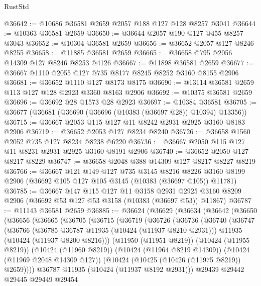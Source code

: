 \begin{lexlean}{RustStd}
\begin{coremodule}
@36642 := @10686 @36581 @2659 @2057 @188 @127 @128 @8257 @3041
@36644 := @10363 @36581 @2659
@36650 := @36644 @2057 @190 @127 @455 @8257 @3043
@36652 := @10304 @36581 @2659
@36656 := @36652 @2057 @127 @8246 @8255
@36658 := @11885 @36581 @2659
@36665 := @36658 @795 @2056 @14309 @127 @8246 @8253 @4126
@36667 := @11898 @36581 @2659
@36677 := @36667 @1110 @2055 @127 @735 @8177 @8245 @8252 @3160 @8155 @2906
@36681 := @36652 @1110 @127 @8173 @8175
@36690 := @13114 @36581 @2659 @113 @127 @128 @2923 @3360 @8163 @2906
@36692 := @10375 @36581 @2659
@36696 := @36692 @28 @1573 @28 @2923
@36697 := @10384 @36581
@36705 := @36677 (@36681 (@36690 (@36696 (@10383 (@36697 @28)) @10394) @13356))
@36715 := @36667 @2053 @115 @127 @11 @8242 @2931 @2925 @3160 @8183 @2906
@36719 := @36652 @2053 @127 @8234 @8240
@36726 := @36658 @1560 @2052 @735 @127 @8234 @8238 @6220
@36736 := @36667 @2050 @115 @127 @11 @8231 @2931 @2925 @3160 @8191 @2906
@36740 := @36652 @2050 @127 @8217 @8229
@36747 := @36658 @2048 @388 @14309 @127 @8217 @8227 @8219
@36766 := @36667
    @121
    @149
    @127
    @735
    @3145
    @8216
    @8226
    @3160
    @8199
    @2906
    (@36692 @105 @127 @105 @3145 (@10383 (@36697 @105)) @11781)
@36785 := @36667
    @147
    @115
    @127
    @11
    @3158
    @2931
    @2925
    @3160
    @8209
    @2906
    (@36692 @53 @127 @53 @3158 (@10383 (@36697 @53)) @11867)
@36787 := @11143 @36581 @2659
@36885 := @36624
    (@36629
      (@36634
        (@36642
          (@36650
            (@36656
              (@36665
                (@36705
                  (@36715
                    (@36719
                      (@36726
                        (@36736
                          (@36740
                            (@36747
                              (@36766
                                (@36785 @36787 @11935 (@10424 (@11937 @8210 @2931)))
                                @11935
                                (@10424 (@11937 @8200 @8216)))
                              (@11950 (@11951 @8219))
                              (@10424 (@11955 @8219))
                              (@10424 (@11960 @8219))
                              (@10424 (@11964 @8219 @14309))
                              (@10424 (@11969 @2048 @14309 @127))
                              (@10424 (@10425 (@10426 (@11975 @8219)) @2659))))
                          @36787
                          @11935
                          (@10424 (@11937 @8192 @2931)))
                        @29439
                        @29442
                        @29445
                        @29449
                        @29454

\end{coremodule}
\end{lexlean}
